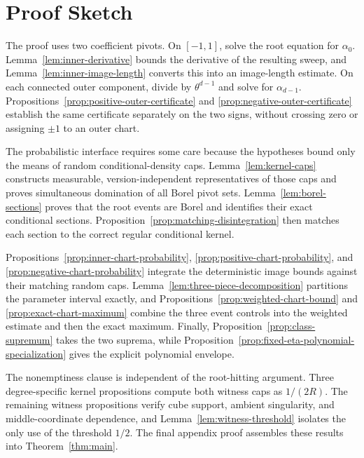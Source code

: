 \section{Proof Sketch}

The proof uses two coefficient pivots.  On $[-1,1]$, solve the root equation
for $\alpha_0$.  Lemma~\ref{lem:inner-derivative} bounds the derivative of
the resulting sweep, and Lemma~\ref{lem:inner-image-length} converts this
into an image-length estimate.  On each connected outer component, divide by
$\theta^{d-1}$ and solve for $\alpha_{d-1}$.
Propositions~\ref{prop:positive-outer-certificate} and
\ref{prop:negative-outer-certificate} establish the same certificate
separately on the two signs, without crossing zero or assigning $\pm1$ to an
outer chart.

The probabilistic interface requires some care because the hypotheses bound
only the means of random conditional-density caps.  Lemma~\ref{lem:kernel-caps}
constructs measurable, version-independent representatives of those caps and
proves simultaneous domination of all Borel pivot sets.  Lemma~\ref{lem:borel-sections}
proves that the root events are Borel and identifies their exact conditional
sections.  Proposition~\ref{prop:matching-disintegration} then matches each
section to the correct regular conditional kernel.

Propositions~\ref{prop:inner-chart-probability},
\ref{prop:positive-chart-probability}, and
\ref{prop:negative-chart-probability} integrate the deterministic image
bounds against their matching random caps.  Lemma~\ref{lem:three-piece-decomposition}
partitions the parameter interval exactly, and
Propositions~\ref{prop:weighted-chart-bound} and
\ref{prop:exact-chart-maximum} combine the three event controls into the
weighted estimate and then the exact maximum.  Finally,
Proposition~\ref{prop:class-supremum} takes the two suprema, while
Proposition~\ref{prop:fixed-eta-polynomial-specialization} gives the explicit
polynomial envelope.

The nonemptiness clause is independent of the root-hitting argument.  Three
degree-specific kernel propositions compute both witness caps as $1/(2R)$.
The remaining witness propositions verify cube support, ambient singularity,
and middle-coordinate dependence, and Lemma~\ref{lem:witness-threshold}
isolates the only use of the threshold $1/2$.  The final appendix proof
assembles these results into Theorem~\ref{thm:main}.
